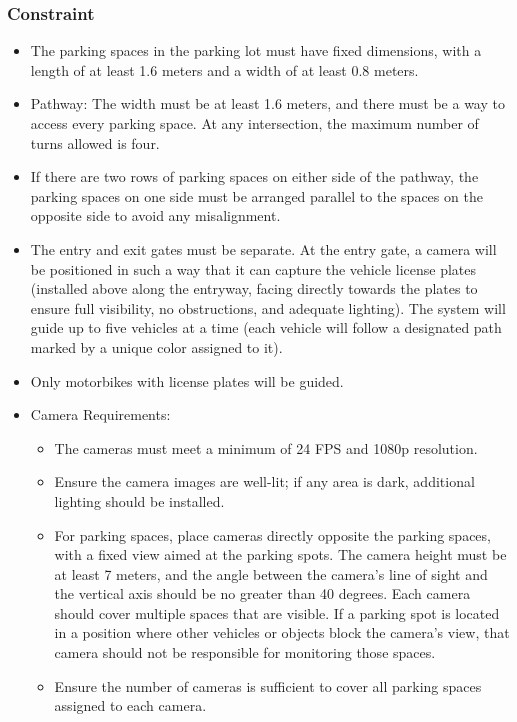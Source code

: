 \documentclass{article}
\begin{document}
    \subsubsection{Constraint}
    \begin{itemize}[label=-]
      \item The parking spaces in the parking lot must have fixed dimensions, with a length of at least 1.6 meters and a width of at least 0.8 meters.
      \item Pathway: The width must be at least 1.6 meters, and there must be a way to access every parking space. At any intersection, the maximum number of turns allowed is four.
      \item If there are two rows of parking spaces on either side of the pathway, the parking spaces on one side must be arranged parallel to the spaces on the opposite side to avoid any misalignment.
      \item The entry and exit gates must be separate. At the entry gate, a camera will be positioned in such a way that it can capture the vehicle license plates (installed above along the entryway, facing directly towards the plates to ensure full visibility, no obstructions, and adequate lighting). The system will guide up to five vehicles at a time (each vehicle will follow a designated path marked by a unique color assigned to it).
      \item Only motorbikes with license plates will be guided.
      \item Camera Requirements:
        \begin{itemize}[label=·]
          \item The cameras must meet a minimum of 24 FPS and 1080p resolution.
          \item Ensure the camera images are well-lit; if any area is dark, additional lighting should be installed.
          \item For parking spaces, place cameras directly opposite the parking spaces, with a fixed view aimed at the parking spots. The camera height must be at least 7 meters, and the angle between the camera's line of sight and the vertical axis should be no greater than 40 degrees. Each camera should cover multiple spaces that are visible. If a parking spot is located in a position where other vehicles or objects block the camera's view, that camera should not be responsible for monitoring those spaces.
          \item Ensure the number of cameras is sufficient to cover all parking spaces assigned to each camera.

\end{itemize}
\end{itemize}
\end{document}
